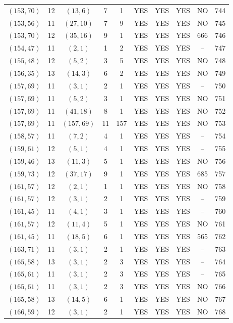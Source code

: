 \begin{longtable}{|c|c|c|c|c|c|c|c|c|c|}
$(153, 70)$ & 12 & $(13, 6)$ & 7 & 1 & YES & YES & YES & NO & 744\\
$(153, 56)$ & 11 & $(27, 10)$ & 7 & 9 & YES & YES & YES & NO & 745\\
$(153, 70)$ & 12 & $(35, 16)$ & 9 & 1 & YES & YES & YES & 666 & 746\\
$(154, 47)$ & 11 & $(2, 1)$ & 1 & 2 & YES & YES & YES & -- & 747\\
$(155, 48)$ & 12 & $(5, 2)$ & 3 & 5 & YES & YES & YES & NO & 748\\
$(156, 35)$ & 13 & $(14, 3)$ & 6 & 2 & YES & YES & YES & NO & 749\\
$(157, 69)$ & 11 & $(3, 1)$ & 2 & 1 & YES & YES & YES & -- & 750\\
$(157, 69)$ & 11 & $(5, 2)$ & 3 & 1 & YES & YES & YES & NO & 751\\
$(157, 69)$ & 11 & $(41, 18)$ & 8 & 1 & YES & YES & YES & NO & 752\\
$(157, 69)$ & 11 & $(157, 69)$ & 11 & 157 & YES & YES & YES & NO & 753\\
$(158, 57)$ & 11 & $(7, 2)$ & 4 & 1 & YES & YES & YES & -- & 754\\
$(159, 61)$ & 12 & $(5, 1)$ & 4 & 1 & YES & YES & YES & -- & 755\\
$(159, 46)$ & 13 & $(11, 3)$ & 5 & 1 & YES & YES & YES & NO & 756\\
$(159, 73)$ & 12 & $(37, 17)$ & 9 & 1 & YES & YES & YES & 685 & 757\\
$(161, 57)$ & 12 & $(2, 1)$ & 1 & 1 & YES & YES & YES & NO & 758\\
$(161, 57)$ & 12 & $(3, 1)$ & 2 & 1 & YES & YES & YES & -- & 759\\
$(161, 45)$ & 11 & $(4, 1)$ & 3 & 1 & YES & YES & YES & -- & 760\\
$(161, 57)$ & 12 & $(11, 4)$ & 5 & 1 & YES & YES & YES & NO & 761\\
$(161, 45)$ & 11 & $(18, 5)$ & 6 & 1 & YES & YES & YES & 565 & 762\\
$(163, 71)$ & 11 & $(3, 1)$ & 2 & 1 & YES & YES & YES & -- & 763\\
$(165, 58)$ & 13 & $(3, 1)$ & 2 & 3 & YES & YES & YES & -- & 764\\
$(165, 61)$ & 11 & $(3, 1)$ & 2 & 3 & YES & YES & YES & -- & 765\\
$(165, 61)$ & 11 & $(3, 1)$ & 2 & 3 & YES & YES & YES & NO & 766\\
$(165, 58)$ & 13 & $(14, 5)$ & 6 & 1 & YES & YES & YES & NO & 767\\
$(166, 59)$ & 12 & $(3, 1)$ & 2 & 1 & YES & YES & YES & NO & 768\\

\end{longtable}
